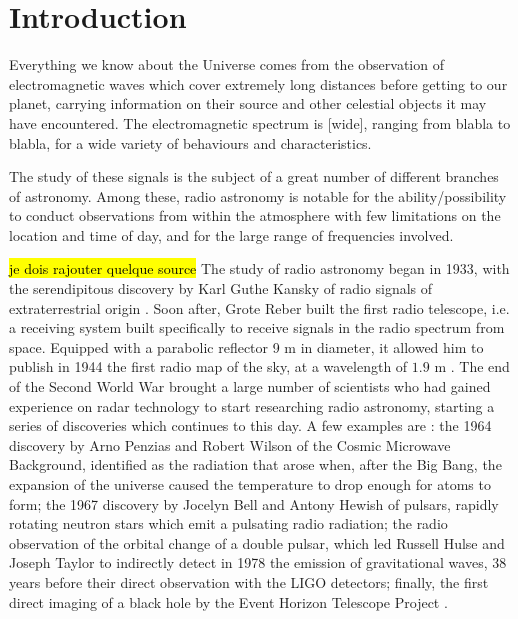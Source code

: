 \section{Introduction}
Everything we know about the Universe comes from the observation of electromagnetic waves which cover extremely long distances before getting to our planet, carrying information on their source and other celestial objects it may have encountered.
The electromagnetic spectrum is [wide], ranging from blabla to blabla, for a wide variety of behaviours and characteristics.

The study of these signals is the subject of a great number of different branches of astronomy. Among these, radio astronomy is notable for the ability/possibility to conduct observations from within the atmosphere with few limitations on the location and time of day, and for the large range of frequencies involved.

\hl{je dois rajouter quelque source} The study of radio astronomy began in 1933, with the serendipitous discovery by Karl Guthe Kansky of radio signals of extraterrestrial origin \cite{condon_essential_2016}. 
Soon after, Grote Reber built the first radio telescope, i.e. a receiving system built specifically to receive signals in the radio spectrum from space. Equipped with a parabolic reflector 9 m in diameter, it allowed him to publish in 1944 the first radio map of the sky, at a wavelength of $1.9$ m \cite{lauterbach_radio_2022}.
The end of the Second World War brought a large number of scientists who had gained experience on radar technology to start researching radio astronomy, starting a series of discoveries which continues to this day.
A few examples are \cite{lauterbach_radio_2022}: 
the 1964 discovery by Arno Penzias and Robert Wilson of the Cosmic Microwave Background, identified as the radiation that arose when, after the Big Bang, the expansion of the universe caused the temperature to drop enough for atoms to form;
the 1967 discovery by Jocelyn Bell and Antony Hewish of pulsars, rapidly rotating neutron stars which emit a pulsating radio radiation; 
the radio observation of the orbital change of a double pulsar, which led Russell Hulse and Joseph Taylor to indirectly detect in 1978 the emission of gravitational waves, 38 years before their direct observation with the LIGO detectors;
finally, the first direct imaging of a black hole by the Event Horizon Telescope Project \cite{the_event_horizon_telescope_collaboration_first_2019}.

